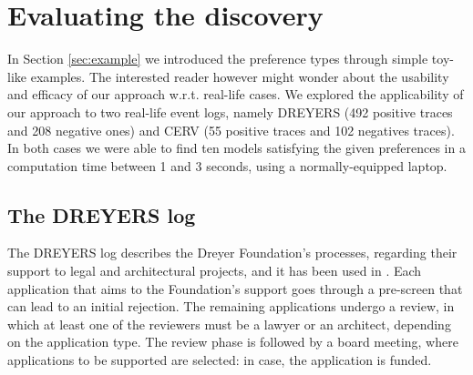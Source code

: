 









\section{Evaluating the discovery}
\label{sec:evaluation}


In Section \ref{sec:example} we introduced the preference types through simple toy-like examples. The interested reader however might wonder about the usability and efficacy of our approach w.r.t. real-life cases. We explored the applicability of our approach to two real-life event logs, namely DREYERS (492 positive traces and 208 negative ones) and CERV (55 positive traces and 102 negatives traces). In both cases we were able to find ten models satisfying the given preferences in a computation time between 1 and 3 seconds, using a normally-equipped laptop.



\subsection{The DREYERS log}
\label{subsec:dreyers}

The DREYERS log describes the Dreyer Foundation’s processes, regarding their support to legal and architectural projects, and it has been used in \cite{DBLP:conf/ssci/DeboisS15,DBLP:conf/bpm/SlaatsDB21}. Each application that aims to the Foundation's support goes through a pre-screen that can lead to an initial rejection. The remaining applications undergo a review, in which at least one of the reviewers must be a lawyer or an architect, depending on the application type. The review phase is followed by a board meeting, where applications to be supported are selected: in case, the application is funded.

